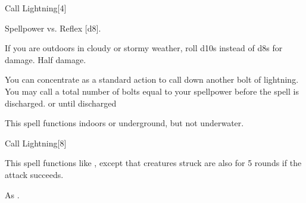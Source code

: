 \begin{spellsection}{Call Lightning}[4]
    \begin{spellheader}
    \end{spellheader}
    \begin{spellcontent}
        \begin{spelltargetinginfo}
        \end{spelltargetinginfo}
        \begin{spelleffects}
            \begin{spellattack}{Spellpower vs. Reflex}
                \spellsuccess {}[d8].

                If you are outdoors in cloudy or stormy weather, roll d10s instead of d8s for damage.
                \spellfailure Half damage.
            \end{spellattack}
            \spelleffect You can concentrate as a standard action to call down another bolt of lightning. You may call a total number of bolts equal to your spellpower before the spell is discharged.
            \spelldur \durmed or until discharged \dismissable
        \end{spelleffects}
    \end{spellcontent}
    \begin{spellfooter}
        \spellnotes This spell functions indoors or underground, but not underwater. \destructivespellnotes
        \miscastexplode
    \end{spellfooter}
\end{spellsection}

\begin{spellsection}[Greater]{Call Lightning}[8]
    \begin{spellheader}
    \end{spellheader}
    \begin{spellcontent}
        \begin{spelltargetinginfo}
        \end{spelltargetinginfo}
        \begin{spelleffects}
            \spellspecial This spell functions like , except that creatures struck are also \staggered for 5 rounds if the attack succeeds.
        \end{spelleffects}
    \end{spellcontent}
    \begin{spellfooter}
        \spellnotes As .
        \miscastexplode
    \end{spellfooter}
\end{spellsection}

